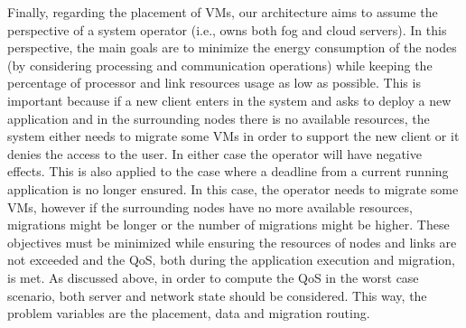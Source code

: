 \noindent\tab Finally, regarding the placement of VMs, our architecture aims to assume the perspective of a system operator (i.e., owns both fog and cloud servers). In this perspective, the main goals are to minimize the energy consumption of the nodes (by considering processing and communication operations) while keeping the percentage of processor and link resources usage as low as possible. This is important because if a new client enters in the system and asks to deploy a new application and in the surrounding nodes there is no available resources, the system either needs to migrate some VMs in order to support the new client or it denies the access to the user. In either case the operator will have negative effects. This is also applied to the case where a deadline from a current running application is no longer ensured. In this case, the operator needs to migrate some VMs, however if the surrounding nodes have no more available resources, migrations might be longer or the number of migrations might be higher. These objectives must be minimized while ensuring the resources of nodes and links are not exceeded and the QoS, both during the application execution and migration, is met. As discussed above, in order to compute the QoS in the worst case scenario, both server and network state should be considered. This way, the problem variables are the placement, data and migration routing.
